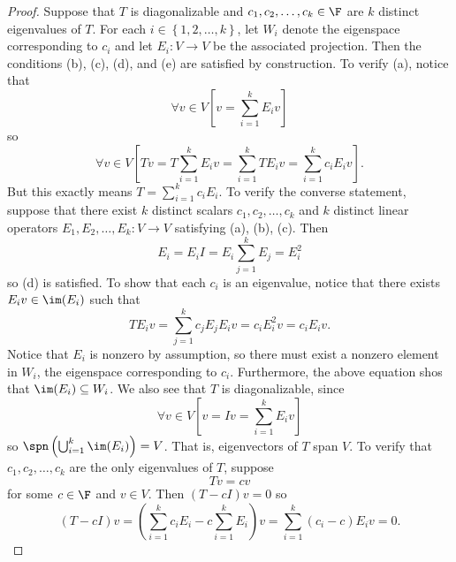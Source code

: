 \documentclass[linearalgebraII]{subfiles}
\begin{document}
    \begin{proof}
        Suppose that $T$ is diagonalizable and $c_1, c_2, \ldots, c_k\in \F$ are $k$ distinct eigenvalues of $T$. For each $i\in \left\lbrace 1, 2, \ldots, k \right\rbrace$, let $W_i$ denote the eigenspace corresponding to $c_i$ and let $E_i:V\to V$ be the associated projection. Then the conditions (b), (c), (d), and (e) are satisfied by construction. To verify (a), notice that
        \begin{equation*}
            \forall v\in V \left[ v = \sum^{k}_{i=1} E_iv \right] 
        \end{equation*}
        so
        \begin{equation*}
            \forall v\in V \left[ Tv = T \sum^{k}_{i=1} E_iv = \sum^{k}_{i=1} TE_iv = \sum^{k}_{i=1} c_iE_iv \right].
        \end{equation*}
        But this exactly means $T = \sum^{k}_{i=1} c_iE_i$. To verify the converse statement, suppose that there exist $k$ distinct scalars $c_1, c_2, \ldots, c_k$ and $k$ distinct linear operators $E_1, E_2, \ldots, E_k:V\to V$ satisfying (a), (b), (c). Then
        \begin{equation*}
            E_i = E_iI = E_i \sum^{k}_{j=1} E_j = E_i^2
        \end{equation*} 
        so (d) is satisfied. To show that each $c_i$ is an eigenvalue, notice that there exists $E_iv\in \im(E_i)$ such that
        \begin{equation*}
            TE_iv = \sum^{k}_{j=1} c_jE_jE_iv = c_iE_i^2v = c_iE_iv.
        \end{equation*}
        Notice that $E_i$ is nonzero by assumption, so there must exist a nonzero element in $W_i$, the eigenspace corresponding to $c_i$. Furthermore, the above equation shos that $\im(E_i)\subseteq W_i$. We also see that $T$ is diagonalizable, since
        \begin{equation*}
            \forall v\in V \left[ v = Iv = \sum^{k}_{i=1} E_iv \right] 
        \end{equation*}
        so $\spn \left( \bigcup^{k}_{i=1} \im(E_i) \right) = V$. That is, eigenvectors of $T$ span $V$. To verify that $c_1, c_2, \ldots, c_k$ are the only eigenvalues of $T$, suppose
        \begin{equation*}
            Tv = cv
        \end{equation*}
        for some $c\in \F$ and $v\in V$. Then $(T-cI)v = 0$ so
        \begin{equation*}
            (T-cI)v = \left( \sum^{k}_{i=1} c_iE_i - c \sum^{k}_{i=1} E_i \right) v = \sum^{k}_{i=1} (c_i-c) E_iv = 0.

\end{equation*}
\end{proof}
\end{document}
